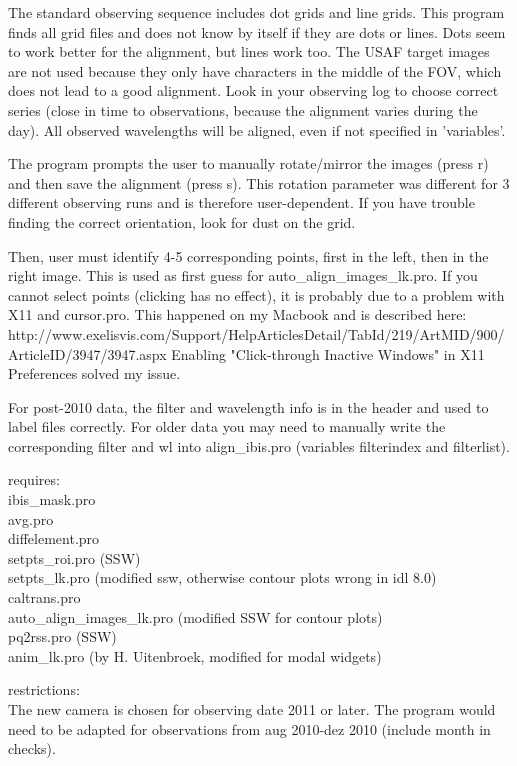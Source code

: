 \documentclass[a4paper,12pt]{article}
\begin{document}
The standard observing sequence includes dot grids and line grids. This program finds all grid files and  does not know by itself if they are dots or lines. Dots seem to work better for the alignment, but lines work too. The USAF target images are not used because they only have characters in the middle of the FOV, which does not lead to a good alignment. Look in your observing log to choose correct series (close in time to observations, because the alignment varies during the day). All observed wavelengths will be aligned, even if not specified in 'variables'.

The program prompts the user to manually rotate/mirror the images (press r) and then save the alignment (press s). This rotation parameter was different for 3 different observing runs and is therefore user-dependent. If you have trouble finding the correct orientation, look for dust on the grid.

Then, user must identify 4-5 corresponding points, first in the left,
then in the right image. This is used as first guess for
auto\_align\_images\_lk.pro. If you cannot select points (clicking has
no effect), it is probably due to a problem with X11 and cursor.pro. This happened on
my Macbook and is described here:\\
http://www.exelisvis.com/Support/HelpArticlesDetail/TabId/219/ArtMID/900/ArticleID/3947/3947.aspx
Enabling "Click-through Inactive Windows" in X11 Preferences solved my issue.

For post-2010 data, the filter and wavelength info is in the header and used to label files correctly. For older data you may need to manually write the corresponding filter and wl into align\_ibis.pro (variables filterindex and filterlist).


requires:\\
 ibis\_mask.pro\\
 avg.pro\\
 diffelement.pro\\
 setpts\_roi.pro (SSW)\\
 setpts\_lk.pro (modified ssw, otherwise contour plots wrong in idl 8.0)\\
 caltrans.pro\\
 auto\_align\_images\_lk.pro (modified SSW for contour plots)\\
 pq2rss.pro (SSW)\\
 anim\_lk.pro (by H. Uitenbroek, modified for modal widgets)


restrictions:\\
The new camera is chosen for observing date 2011 or later. The program
would need to be adapted for observations from aug 2010-dez 2010
 (include month in checks).
\end{document}
